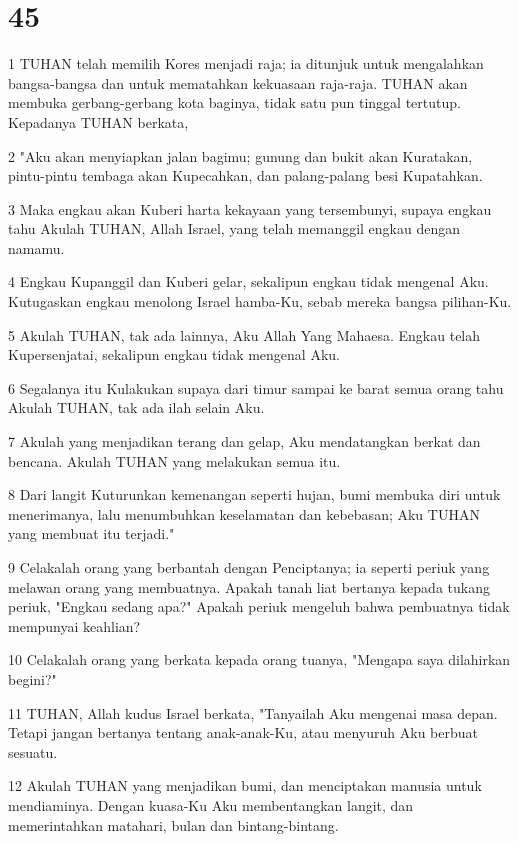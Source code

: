 \chapter{45}

\par 1 TUHAN telah memilih Kores menjadi raja; ia ditunjuk untuk mengalahkan bangsa-bangsa dan untuk mematahkan kekuasaan raja-raja. TUHAN akan membuka gerbang-gerbang kota baginya, tidak satu pun tinggal tertutup. Kepadanya TUHAN berkata,
\par 2 "Aku akan menyiapkan jalan bagimu; gunung dan bukit akan Kuratakan, pintu-pintu tembaga akan Kupecahkan, dan palang-palang besi Kupatahkan.
\par 3 Maka engkau akan Kuberi harta kekayaan yang tersembunyi, supaya engkau tahu Akulah TUHAN, Allah Israel, yang telah memanggil engkau dengan namamu.
\par 4 Engkau Kupanggil dan Kuberi gelar, sekalipun engkau tidak mengenal Aku. Kutugaskan engkau menolong Israel hamba-Ku, sebab mereka bangsa pilihan-Ku.
\par 5 Akulah TUHAN, tak ada lainnya, Aku Allah Yang Mahaesa. Engkau telah Kupersenjatai, sekalipun engkau tidak mengenal Aku.
\par 6 Segalanya itu Kulakukan supaya dari timur sampai ke barat semua orang tahu Akulah TUHAN, tak ada ilah selain Aku.
\par 7 Akulah yang menjadikan terang dan gelap, Aku mendatangkan berkat dan bencana. Akulah TUHAN yang melakukan semua itu.
\par 8 Dari langit Kuturunkan kemenangan seperti hujan, bumi membuka diri untuk menerimanya, lalu menumbuhkan keselamatan dan kebebasan; Aku TUHAN yang membuat itu terjadi."
\par 9 Celakalah orang yang berbantah dengan Penciptanya; ia seperti periuk yang melawan orang yang membuatnya. Apakah tanah liat bertanya kepada tukang periuk, "Engkau sedang apa?" Apakah periuk mengeluh bahwa pembuatnya tidak mempunyai keahlian?
\par 10 Celakalah orang yang berkata kepada orang tuanya, "Mengapa saya dilahirkan begini?"
\par 11 TUHAN, Allah kudus Israel berkata, "Tanyailah Aku mengenai masa depan. Tetapi jangan bertanya tentang anak-anak-Ku, atau menyuruh Aku berbuat sesuatu.
\par 12 Akulah TUHAN yang menjadikan bumi, dan menciptakan manusia untuk mendiaminya. Dengan kuasa-Ku Aku membentangkan langit, dan memerintahkan matahari, bulan dan bintang-bintang.
